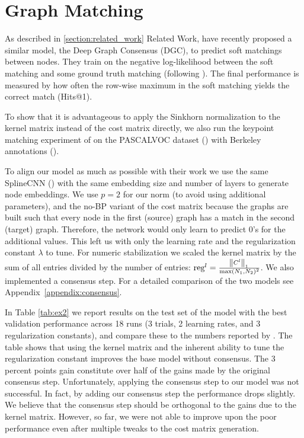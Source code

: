\section{Graph Matching}

As described in \ref{section:related_work} Related Work, \cite{fey2020_update} have recently proposed a similar model, the Deep Graph Consensus (DGC), to predict soft matchings between nodes. They train on the negative log-likelihood between the soft matching and some ground truth matching (following \citealp{wang2019}). The final performance is measured by how often the row-wise maximum in the soft matching yields the correct match (Hits@1).

To show that it is advantageous to apply the Sinkhorn normalization to the kernel matrix instead of the cost matrix directly, we also run the keypoint matching experiment of \cite{fey2020_update} on the PASCALVOC  dataset (\citealp{pascal2010}) with Berkeley annotations (\citealp{annotations2009}).

To align our model as much as possible with their work we use the same SplineCNN (\citealp{spline2018}) with the same embedding size and number of layers to generate node embeddings. We use $p=2$ for our norm (to avoid using additional parameters), and the no-BP variant of the cost matrix because the graphs are built such that every node in the first (source) graph has a match in the second (target) graph. Therefore, the network would only learn to predict 0’s for the additional values. This left us with only the learning rate and the regularization constant $\lambda$ to tune. For numeric stabilization we scaled the kernel matrix by the sum of all entries divided by the number of entries: $\text{reg}^l = \frac{\norm{C^l}_1}{\max(N_1,N_2)^2}$. We also implemented a consensus step. For a detailed comparison of the two models see \mbox{Appendix \ref{appendix:consensus}}.

In Table \ref{tab:ex2} we report results on the test set of the model with the best validation performance across 18 runs (3 trials, 2 learning rates, and 3 regularization constants), and compare these to the numbers reported by \cite{fey2020_update}. The table shows that using the kernel matrix and the inherent ability to tune the regularization constant improves the base model without consensus. The 3 percent points gain constitute over half of the gains made by the original consensus step. Unfortunately, applying the consensus step to our model was not successful. In fact, by adding our consensus step the performance drops slightly. We believe that the consensus step should be orthogonal to the gains due to the kernel matrix. However, so far, we were not able to improve upon the poor performance even after multiple tweaks to the cost matrix generation.

